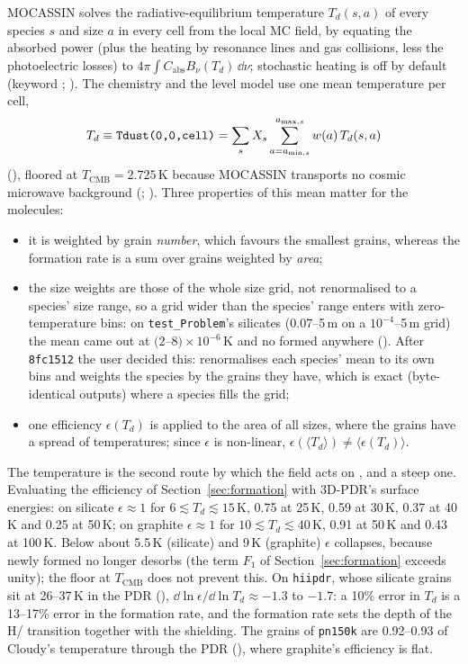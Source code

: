 MOCASSIN solves the radiative-equilibrium temperature $T_d(s,a)$ of every
species $s$ and size $a$ in every cell from the local MC field, by equating
the absorbed power (plus the heating by resonance lines and gas collisions,
less the photoelectric losses) to $4\pi\int C_{\mathrm{abs}}B_\nu(T_d)\,\dd\nu$; stochastic
heating is off by default (keyword ; ). The
chemistry and the level model use one mean temperature per cell,
\begin{equation}
  T_d \equiv \rtn{Tdust(0,0,cell)} = \sum_s X_s \sum_{a=a_{\min,s}}^{a_{\max,s}} w(a)\, T_d(s,a)
\end{equation}
(), floored at $T_{\mathrm{CMB}}=2.725$\,K
because MOCASSIN transports no cosmic microwave background
(; ). Three properties of this mean
matter for the molecules:
\begin{itemize}
\item it is weighted by grain \emph{number}, which favours the smallest
  grains, whereas the formation rate is a sum over grains weighted by
  \emph{area};
\item the size weights are those of the whole size grid, not renormalised to
  a species' size range, so a grid wider than the species' range enters with
  zero-temperature bins: on \texttt{test\_Problem}'s silicates (0.07--5\,\textmu m
  on a $10^{-4}$--5\,\textmu m grid) the mean came out at $(2$--$8)\times10^{-6}$\,K
  and no \Htwo{} formed anywhere (). After \texttt{8fc1512} the user
  decided this:  renormalises each species' mean to its own bins and
  weights the species by the grains they have, which is exact (byte-identical
  outputs) where a species fills the grid;
\item one efficiency $\epsilon(T_d)$ is applied to the area of all sizes, where
  the grains have a spread of temperatures; since $\epsilon$ is non-linear,
  $\epsilon(\langle T_d\rangle)\ne\langle\epsilon(T_d)\rangle$.
\end{itemize}
The temperature is the second route by which the field acts on \Htwo{}, and
a steep one. Evaluating the efficiency of Section~\ref{sec:formation} with
3D-PDR's surface energies: on silicate $\epsilon\approx1$ for
$6\lesssim T_d\lesssim15$\,K, 0.75 at 25\,K, 0.59 at 30\,K, 0.37 at 40\,K and 0.25
at 50\,K; on graphite $\epsilon\approx1$ for $10\lesssim T_d\lesssim40$\,K, 0.91 at
50\,K and 0.43 at 100\,K. Below about 5.5\,K (silicate) and 9\,K (graphite)
$\epsilon$ collapses, because newly formed \Htwo{} no longer desorbs (the
term $F_1$ of Section~\ref{sec:formation} exceeds unity); the floor at
$T_{\mathrm{CMB}}$ does not prevent this. On \texttt{hiipdr}, whose silicate
grains sit at 26--37\,K in the PDR (), $\dd\ln\epsilon/\dd\ln T_d\approx-1.3$
to $-1.7$: a 10\% error in $T_d$ is a 13--17\% error in the formation rate,
and the formation rate sets the depth of the H/\Htwo{} transition together
with the shielding. The grains of \texttt{pn150k} are 0.92--0.93 of Cloudy's
temperature through the PDR (), where graphite's efficiency is flat.

